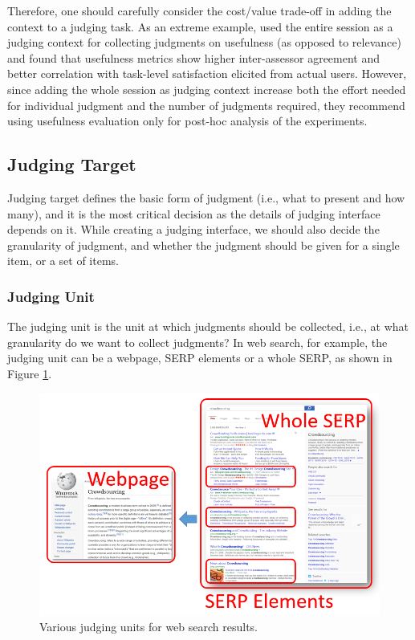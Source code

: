 Therefore, one should carefully consider the cost/value trade-off in adding the context to a judging task. As an extreme example, \cite{Mao:2016} used the entire session as a judging context for collecting judgments on usefulness (as opposed to relevance) and found that usefulness metrics show higher inter-assessor agreement and better correlation with task-level satisfaction elicited from actual users. However, since adding the whole session as judging context increase both the effort needed for individual judgment and the number of judgments required, they recommend using usefulness evaluation only for post-hoc analysis of the experiments.

\subsection{Judging Target}
Judging target defines the basic form of judgment (i.e., what to present  and how many), and it is the most critical decision as the details of judging interface depends on it. While creating a judging interface, we should also decide the granularity of judgment, and whether the judgment should be given for a single item, or a set of items. 

\subsubsection{Judging Unit}
The judging unit is the unit at which judgments should be collected, i.e., at what granularity do we want to collect judgments? In web search, for example, the judging unit can be a webpage, SERP elements or a whole SERP, as shown in Figure \ref{fig:judging_units}. 

\begin{figure}
	\begin{center}
		\includegraphics[scale=0.5]{images/judging_units}
		\caption{Various judging units for web search results.} 
		\label{fig:judging_units}
	\end{center}
\end{figure}

